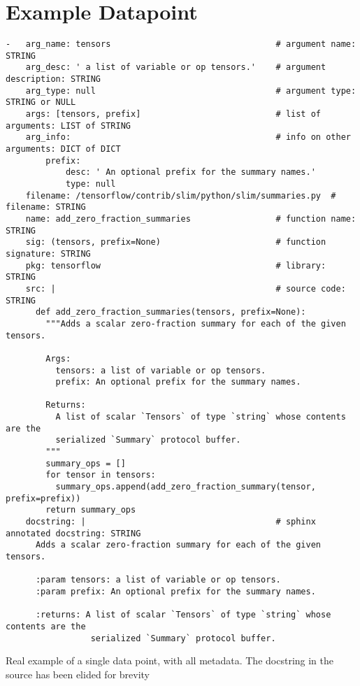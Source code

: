
\chapter{Example Datapoint}
\label{example_datapoint}
\begin{listing}[h!]
\begin{verbatim}
-   arg_name: tensors                                 # argument name: STRING
    arg_desc: ' a list of variable or op tensors.'    # argument description: STRING
    arg_type: null                                    # argument type: STRING or NULL
    args: [tensors, prefix]                           # list of arguments: LIST of STRING
    arg_info:                                         # info on other arguments: DICT of DICT
        prefix: 
            desc: ' An optional prefix for the summary names.' 
            type: null
    filename: /tensorflow/contrib/slim/python/slim/summaries.py  # filename: STRING
    name: add_zero_fraction_summaries                 # function name: STRING 
    sig: (tensors, prefix=None)                       # function signature: STRING
    pkg: tensorflow                                   # library: STRING  
    src: |                                            # source code: STRING 
      def add_zero_fraction_summaries(tensors, prefix=None):
        """Adds a scalar zero-fraction summary for each of the given tensors.
  
        Args:
          tensors: a list of variable or op tensors.
          prefix: An optional prefix for the summary names.
  
        Returns:
          A list of scalar `Tensors` of type `string` whose contents are the
          serialized `Summary` protocol buffer.
        """
        summary_ops = []
        for tensor in tensors:
          summary_ops.append(add_zero_fraction_summary(tensor, prefix=prefix))
        return summary_ops
    docstring: |                                      # sphinx annotated docstring: STRING 
      Adds a scalar zero-fraction summary for each of the given tensors.

      :param tensors: a list of variable or op tensors.
      :param prefix: An optional prefix for the summary names.

      :returns: A list of scalar `Tensors` of type `string` whose contents are the
                 serialized `Summary` protocol buffer.
\end{verbatim}
     \caption{Real example of a single data point, with all metadata. The docstring in the source has been elided for brevity}
     \label{lst:single_point}
\end{listing}